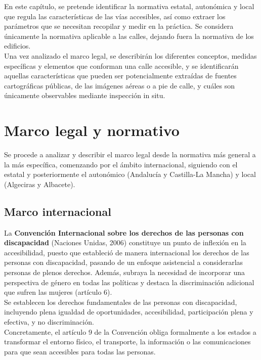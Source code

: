 \label{cap:normativa}

En este capítulo, se pretende identificar la normativa estatal, autonómica y local que regula las características de las vías accesibles, así como extraer los parámetros que se necesitan recopilar y medir en la práctica. Se considera únicamente la normativa aplicable a las calles, dejando fuera la normativa de los edificios.
\\

Una vez analizado el marco legal, se describirán los diferentes conceptos, medidas específicas y elementos que conforman una calle accesible, y se identificarán aquellas características que pueden ser potencialmente extraídas de fuentes cartográficas públicas, de las imágenes aéreas o a pie de calle, y cuáles son únicamente observables mediante inspección in situ.
\\

\section{Marco legal y normativo}

\label{sec:marco-legal}
Se procede a analizar y describir el marco legal desde la normativa más general a la más específica, comenzando por el ámbito internacional, siguiendo con el estatal y posteriormente el autonómico (Andalucía y Castilla-La Mancha) y local (Algeciras y Albacete).

\subsection{Marco internacional}
La \textbf{Convención Internacional sobre los derechos de las personas con discapacidad} (Naciones Unidas, 2006) constituye un punto de inflexión en la accesibilidad, puesto que estableció de manera internacional los derechos de las personas con discapacidad, pasando de un enfoque asistencial a considerarlas personas de plenos derechos. Además, subraya la necesidad de incorporar una perspectiva de género en todas las políticas y destaca la discriminación adicional que sufren las mujeres (artículo 6).
\\

Se establecen los derechos fundamentales de las personas con discapacidad, incluyendo plena igualdad de oportunidades, accesibilidad, participación plena y efectiva, y no discriminación.
\\

Concretamente, el artículo 9 de la Convención obliga formalmente a los estados a transformar el entorno físico, el transporte, la información o las comunicaciones para que sean accesibles para todas las personas.
\\

